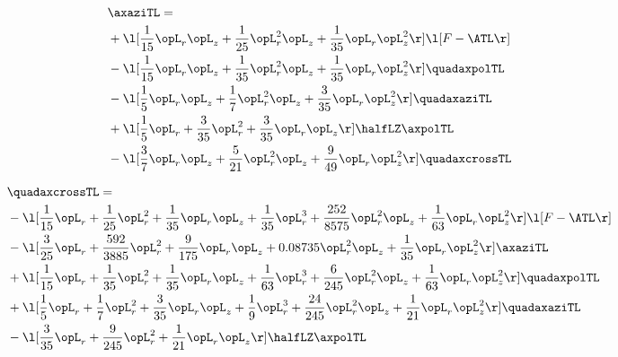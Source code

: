 \begin{alignat}{2} 
\label{eq:linaxaziTL_1} 
& \axaziTL = \\ 
& + \l[ \frac{1}{15} \opL_r \opL_z + \frac{1}{25} \opL_r^{2} \opL_z + \frac{1}{35} \opL_r \opL_z^{2}  \r] \l[ F - \ATL \r] \nonumber \\ 
& - \l[ \frac{1}{15} \opL_r \opL_z + \frac{1}{35} \opL_r^{2} \opL_z + \frac{1}{35} \opL_r \opL_z^{2}  \r] \quadaxpolTL \nonumber \\ 
& - \l[ \frac{1}{5} \opL_r \opL_z + \frac{1}{7} \opL_r^{2} \opL_z + \frac{3}{35} \opL_r \opL_z^{2}  \r] \quadaxaziTL \nonumber \\ 
& + \l[ \frac{1}{5} \opL_r + \frac{3}{35} \opL_r^{2} + \frac{3}{35} \opL_r \opL_z  \r] \halfLZ \axpolTL \nonumber \\ 
& - \l[ \frac{3}{7} \opL_r \opL_z + \frac{5}{21} \opL_r^{2} \opL_z + \frac{9}{49} \opL_r \opL_z^{2}  \r] \quadaxcrossTL \nonumber \\ 
\end{alignat} 


\begin{alignat}{2} 
\label{eq:quadaxcrossTL_1} 
& \quadaxcrossTL = \\ 
& - \l[ \frac{1}{15} \opL_r + \frac{1}{25} \opL_r^{2} + \frac{1}{35} \opL_r \opL_z + \frac{1}{35} \opL_r^{3} + \frac{252}{8575} \opL_r^{2} \opL_z + \frac{1}{63} \opL_r \opL_z^{2}  \r] \l[ F - \ATL \r] \nonumber \\ 
& - \l[ \frac{3}{25} \opL_r + \frac{592}{3885} \opL_r^{2} + \frac{9}{175} \opL_r \opL_z +  0.08735 \opL_r^{2} \opL_z + \frac{1}{35} \opL_r \opL_z^{2}  \r] \axaziTL \nonumber \\ 
& + \l[ \frac{1}{15} \opL_r + \frac{1}{35} \opL_r^{2} + \frac{1}{35} \opL_r \opL_z + \frac{1}{63} \opL_r^{3} + \frac{6}{245} \opL_r^{2} \opL_z + \frac{1}{63} \opL_r \opL_z^{2}  \r] \quadaxpolTL \nonumber \\ 
& + \l[ \frac{1}{5} \opL_r + \frac{1}{7} \opL_r^{2} + \frac{3}{35} \opL_r \opL_z + \frac{1}{9} \opL_r^{3} + \frac{24}{245} \opL_r^{2} \opL_z + \frac{1}{21} \opL_r \opL_z^{2}  \r] \quadaxaziTL \nonumber \\ 
& - \l[ \frac{3}{35} \opL_r + \frac{9}{245} \opL_r^{2} + \frac{1}{21} \opL_r \opL_z  \r] \halfLZ \axpolTL \nonumber \\ 
\end{alignat} 


